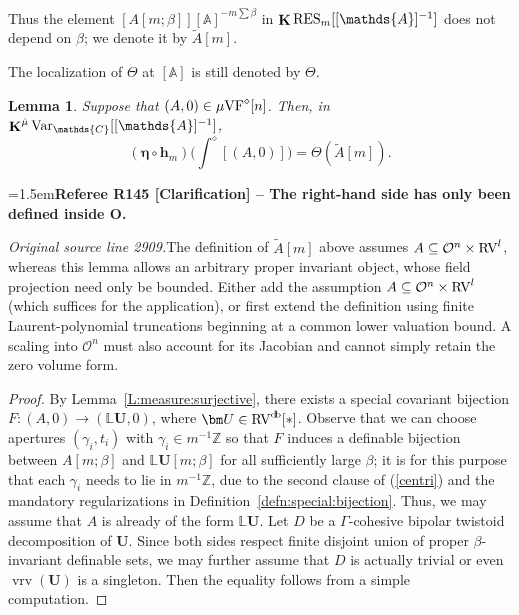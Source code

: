 \documentclass[12pt]{amsart}
\newcommand{\RefereeRemark}[4]{%
  \par\medskip\begingroup\normalfont\small\color{RefereePurple}%
  \emergencystretch=1.5em\noindent\textbf{Referee R#1 [#2] -- #3.}\par\nobreak\noindent #4\par
  \endgroup\medskip
}
\theoremstyle{plain}
\newtheorem{lem}[thm]{Lemma}
\theoremstyle{definition}
\theoremstyle{remark}
\numberwithin{equation}{section}
\theoremstyle{plain}
\newcommand{\VF}{\textup{VF}}
\newcommand{\RV}{\textup{RV}}
\newcommand{\OO}{\mdl O}
\newcommand{\Z}{\mathds{Z}}
\newcommand{\A}{\mathds{A}}
\newcommand{\C}{\mathds{C}}
\newcommand{\0}{\emptyset}
\newcommand{\mdl}[1]{\mathcal{#1}}  %
\newcommand{\bb}[1]{\mathbb{#1}}
\newcommand{\fun}{\longrightarrow}
\newcommand{\mgVF}{{\mu} {\VF}}
\newcommand{\RES}{\textup{RES}}
\DeclareMathOperator{\ggk}{\mathbf{K}}
\DeclareMathOperator{\vrv}{vrv}
\DeclareMathOperator{\db}{d \! b}
\newcommand{\var}{\textup{Var}}
\newcommand{\gmv}{\ggk^{\hat \mu}\var_{\C}}
\begin{document}
Thus the element $[A[m;\beta]][\A]^{- m\sum \beta }$ in $\ggk \RES_{m}[[\A]^{-1}]$ does not depend on $\beta$; we denote it by $\tilde A[m]$.

The localization of $\Theta$ at $[\A]$ is still denoted by $\Theta$.

\begin{lem}\label{inv:dir:com}
Suppose that $(A, 0) \in \mgVF^\diamond[n]$. Then, in $\gmv[[\A]^{-1}]$,
\[
(\bm \eta \circ \bm h_m) \Big( \int^\diamond [(A, 0)] \Big) = \Theta(\tilde A[m]).
\]
\end{lem}

\RefereeRemark{145}{Clarification}{The right-hand side has only been defined inside O}{%
\textit{Original source line 2909.}\quad The definition of $\tilde A[m]$ above assumes $A\subseteq\OO^n\times\RV^l$, whereas this lemma allows an arbitrary proper invariant object, whose field projection need only be bounded. Either add the assumption $A\subseteq\OO^n\times\RV^l$ (which suffices for the application), or first extend the definition using finite Laurent-polynomial truncations beginning at a common lower valuation bound. A scaling into $\OO^n$ must also account for its Jacobian and cannot simply retain the zero volume form.
}
\begin{proof}
By Lemma~\ref{L:measure:surjective}, there exists a special covariant bijection $F : (A, 0) \fun (\bb L \bm U, 0)$, where $\bm U \in \RV^{\db}[*]$. Observe that we can choose apertures $(\gamma_i, t_i)$ with $\gamma_i \in m^{-1} \Z$ so that $F$ induces a definable bijection between $A[m;\beta]$ and  $\bb L \bm U[m;\beta]$ for all sufficiently large $\beta$; it is for this purpose that each $\gamma_i$ needs to lie in $m^{-1} \Z$, due to the second clause of (\ref{centri}) and the mandatory regularizations in Definition~\ref{defn:special:bijection}. Thus, we may assume that $A$ is already of the form $\bb L \bm U$. Let $D$ be a $\Gamma$-cohesive bipolar twistoid decomposition of $\bm U$. Since both sides respect finite disjoint union of proper $\beta$-invariant definable sets, we may further assume that $D$ is actually trivial or even $\vrv(\bm U)$ is a singleton. Then the equality follows from a simple computation.
\end{proof}
\end{document}
